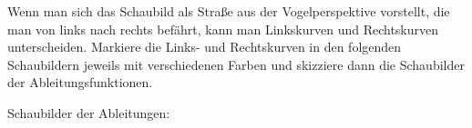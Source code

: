 Wenn man sich das Schaubild als Straße aus der Vogelperspektive vorstellt, die man von links nach rechts befährt, kann man Linkskurven und Rechtskurven unterscheiden. Markiere die Links- und Rechtskurven in den folgenden Schaubildern jeweils mit verschiedenen Farben und skizziere dann die Schaubilder der Ableitungsfunktionen.

\medskip

\begin{minipage}{\textwidth}
\end{minipage}

\medskip

Schaubilder der Ableitungen:

\medskip

